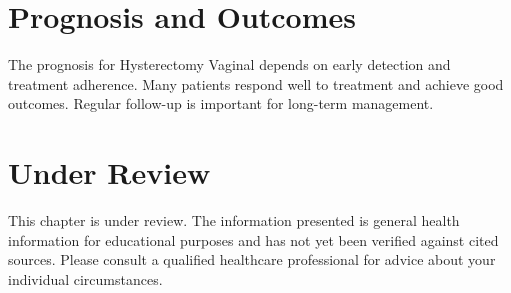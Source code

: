 \section*{Prognosis and Outcomes}
The prognosis for Hysterectomy Vaginal depends on early detection and treatment adherence. Many patients respond well to treatment and achieve good outcomes. Regular follow-up is important for long-term management.
\section*{Under Review}
This chapter is under review. The information presented is general health information for educational purposes and has not yet been verified against cited sources. Please consult a qualified healthcare professional for advice about your individual circumstances.


\clearpage
